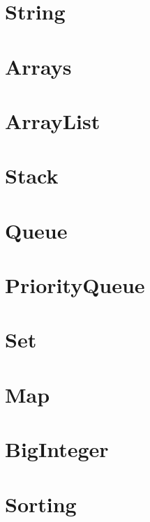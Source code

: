 \documentclass[10pt]{book}
\newcommand{\code}[1]{\inputminted[fontsize=\normalsize]{java}{code/#1}}
\newif\iftodos
\newcommand{\todo}[1]{\iftodos\textcolor{red}{[TODO: #1]}\fi}
\begin{document}
\code{java/ScannerExample.java}

\section{String}

\section{Arrays}

\todo{Basic array template/examples.}

\section{ArrayList}

\section{Stack}

\todo{Stack class}

\section{Queue}

\todo{Queue interface, ArrayDeque class}

\section{PriorityQueue}

\todo{Note lack of decreaseKey operation (Dijkstra), use remove + add,
  not as fast}

\section{Set}

\todo{HashSet, TreeSet}

\section{Map}

\todo{HashMap, TreeMap}

\section{BigInteger} \label{sec:bigint}

\section{Sorting}
\end{document}
